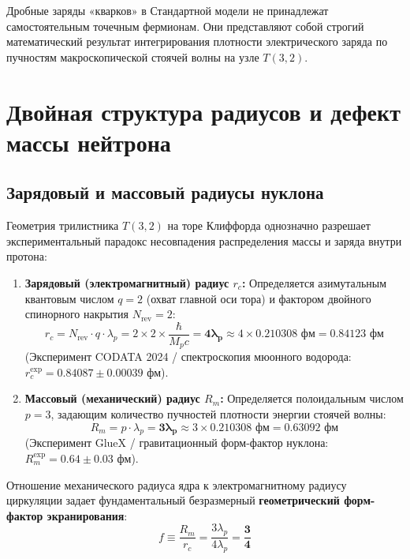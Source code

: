 \documentclass[12pt,a4paper]{article}
\begin{document}
Дробные заряды «кварков» в Стандартной модели не принадлежат самостоятельным точечным фермионам. Они представляют собой строгий математический результат интегрирования плотности электрического заряда по пучностям макроскопической стоячей волны на узле $T(3,2)$.

\section{Двойная структура радиусов и дефект массы нейтрона}

\subsection{Зарядовый и массовый радиусы нуклона}
Геометрия трилистника $T(3,2)$ на торе Клиффорда однозначно разрешает экспериментальный парадокс несовпадения распределения массы и заряда внутри протона:
\begin{enumerate}
	\item \textbf{Зарядовый (электромагнитный) радиус $r_c$:} 
	Определяется азимутальным квантовым числом $q=2$ (охват главной оси тора) и фактором двойного спинорного накрытия $N_{\text{rev}} = 2$:
	\begin{equation}
		r_c = N_{\text{rev}} \cdot q \cdot \lambda_p = 2 \times 2 \times \frac{\hbar}{M_p c} = \mathbf{4 \lambda_p} \approx 4 \times 0.210308 \text{ фм} = \mathbf{0.84123 \text{ фм}}
	\end{equation}
	(Эксперимент CODATA 2024 / спектроскопия мюонного водорода: $r_c^{\text{exp}} = 0.84087 \pm 0.00039$ фм).
	
	\item \textbf{Массовый (механический) радиус $R_m$:} 
	Определяется полоидальным числом $p=3$, задающим количество пучностей плотности энергии стоячей волны:
	\begin{equation}
		R_m = p \cdot \lambda_p = \mathbf{3 \lambda_p} \approx 3 \times 0.210308 \text{ фм} = \mathbf{0.63092 \text{ фм}}
	\end{equation}
	(Эксперимент GlueX / гравитационный форм-фактор нуклона: $R_m^{\text{exp}} = 0.64 \pm 0.03$ фм).
\end{enumerate}

Отношение механического радиуса ядра к электромагнитному радиусу циркуляции задает фундаментальный безразмерный \textbf{геометрический форм-фактор экранирования}:
\begin{equation}
	f \equiv \frac{R_m}{r_c} = \frac{3 \lambda_p}{4 \lambda_p} = \mathbf{\frac{3}{4}}
\end{equation}
\end{document}
